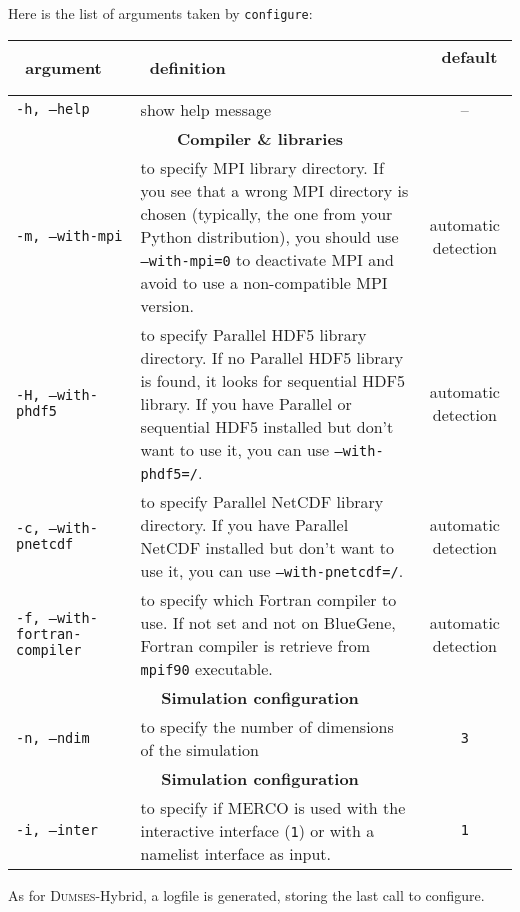 \documentclass[a4paper,12pt]{article}
\begin{document}
Here is the list of arguments taken by \texttt{configure}:
\begin{table}[h!]
  \centering
  {\footnotesize
    \begin{tabular}{l | p{} | c }
      ~\hfill argument\hfill~ & ~\hfill definition\hfill~ & ~\hfill default \hfill~ \\
      \hline
      \hline
      \texttt{-h, --help} & show help message & -- \\
      \hline
      \multicolumn{3}{c}{\normalsize \bfseries Compiler \& libraries} \\
      \hline
      \texttt{-m, --with-mpi} & to specify MPI library directory. If you see that a wrong MPI directory is chosen (typically, the one from your Python distribution), you should use \texttt{--with-mpi=0} to deactivate MPI and avoid to use a non-compatible MPI version. & automatic detection \\
      \texttt{-H, --with-phdf5} & to specify Parallel HDF5 library directory. If no Parallel HDF5 library is found, it looks for sequential HDF5 library. If you have Parallel or sequential HDF5 installed but don't want to use it, you can use \texttt{--with-phdf5=/}. & automatic detection \\
      \texttt{-c, --with-pnetcdf} & to specify Parallel NetCDF library directory. If you have Parallel NetCDF installed but don't want to use it, you can use \texttt{--with-pnetcdf=/}. & automatic detection \\
      \texttt{-f, --with-fortran-compiler} & to specify which Fortran compiler to use. If not set and not on BlueGene, Fortran compiler is retrieve from \texttt{mpif90} executable. & automatic detection \\
      \hline
      \multicolumn{3}{c}{\normalsize \bfseries Simulation configuration} \\
      \hline
      \texttt{-n, --ndim} & to specify the number of dimensions of the simulation & \texttt{3} \\
      \hline
      \multicolumn{3}{c}{\normalsize \bfseries Simulation configuration} \\
      \hline
      \texttt{-i, --inter} & to specify if MERCO is used with the interactive interface (\texttt{1}) or with a namelist interface as input. & \texttt{1} \\
      \hline
    \end{tabular}
  }
\end{table}

As for \textsc{Dumses}-Hybrid, a logfile is generated, storing the last call to configure.
\end{document}
